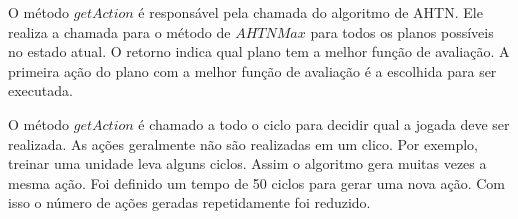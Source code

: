  
O método $\mathit{getAction}$ é responsável pela chamada do algoritmo de AHTN. 
Ele realiza a chamada para o método de $\mathit{AHTNMax}$ para todos os planos possíveis no estado atual.
O retorno indica qual plano tem a melhor função de avaliação.
A primeira ação do plano com a melhor função de avaliação é a escolhida para ser executada. 

O método $\mathit{getAction}$ é chamado a todo o ciclo para decidir qual a jogada deve ser realizada.
As ações geralmente não são realizadas em um clico.
Por exemplo, treinar uma unidade leva alguns ciclos.
Assim o algoritmo gera muitas vezes a mesma ação.
Foi definido um tempo de 50 ciclos para gerar uma nova ação.
Com isso o número de ações geradas repetidamente foi reduzido.

